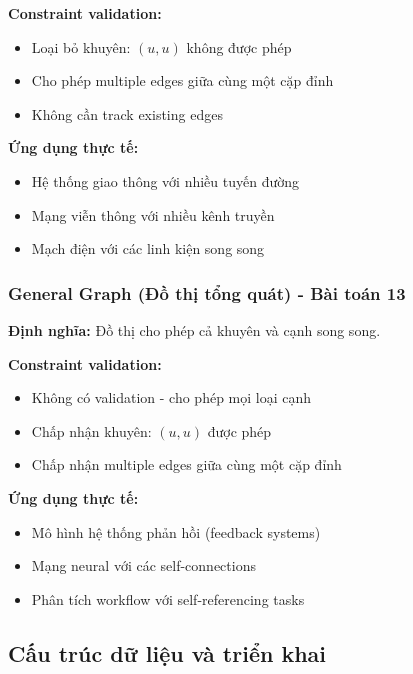 \documentclass[12pt]{article}
\begin{document}
\textbf{Constraint validation:}
\begin{itemize}
    \item Loại bỏ khuyên: $(u, u)$ không được phép
    \item Cho phép multiple edges giữa cùng một cặp đỉnh
    \item Không cần track existing edges
\end{itemize}

\textbf{Ứng dụng thực tế:}
\begin{itemize}
    \item Hệ thống giao thông với nhiều tuyến đường
    \item Mạng viễn thông với nhiều kênh truyền
    \item Mạch điện với các linh kiện song song
\end{itemize}

\subsubsection*{General Graph (Đồ thị tổng quát) - Bài toán 13}
\textbf{Định nghĩa:} Đồ thị cho phép cả khuyên và cạnh song song.

\textbf{Constraint validation:}
\begin{itemize}
    \item Không có validation - cho phép mọi loại cạnh
    \item Chấp nhận khuyên: $(u, u)$ được phép
    \item Chấp nhận multiple edges giữa cùng một cặp đỉnh
\end{itemize}

\textbf{Ứng dụng thực tế:}
\begin{itemize}
    \item Mô hình hệ thống phản hồi (feedback systems)
    \item Mạng neural với các self-connections
    \item Phân tích workflow với self-referencing tasks
\end{itemize}

\subsection*{Cấu trúc dữ liệu và triển khai}
\end{document}
